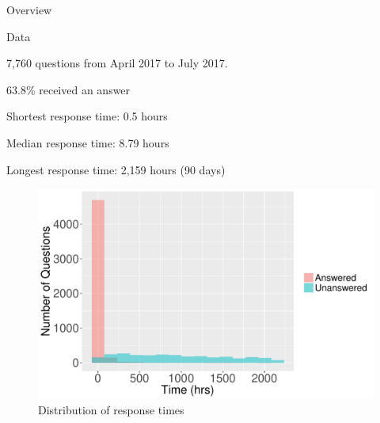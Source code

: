 \documentclass[final]{beamer}
\newlength{\onecolwid}
\begin{document}
\begin{frame}[t]
\begin{columns}[t]
\begin{column}{\onecolwid}
\begin{alertblock}{Overview}
\end{alertblock}


\begin{block}{Data}

\textcolor{dblue!70}{} 7,760 questions from April 2017 to July 2017. 

\vspace{0.5ex}

\textcolor{dblue!70}{} 63.8\% received an answer

\vspace{0.5ex}

\textcolor{dblue!70}{} Shortest response time: 0.5 hours

\vspace{0.5ex}

\textcolor{dblue!70}{} Median response time: 8.79 hours

\vspace{0.5ex}

\textcolor{dblue!70}{} Longest response time: 2,159 hours (90 days)

\end{block}

\begin{figure}
\captionsetup{skip=40pt}
\vspace{4ex}
\includegraphics[width=1\linewidth]{FIG1.pdf}
\caption{Distribution of response times}
\label{fig1}
\end{figure}





\end{column}
\end{columns}
\end{frame}
\end{document}
